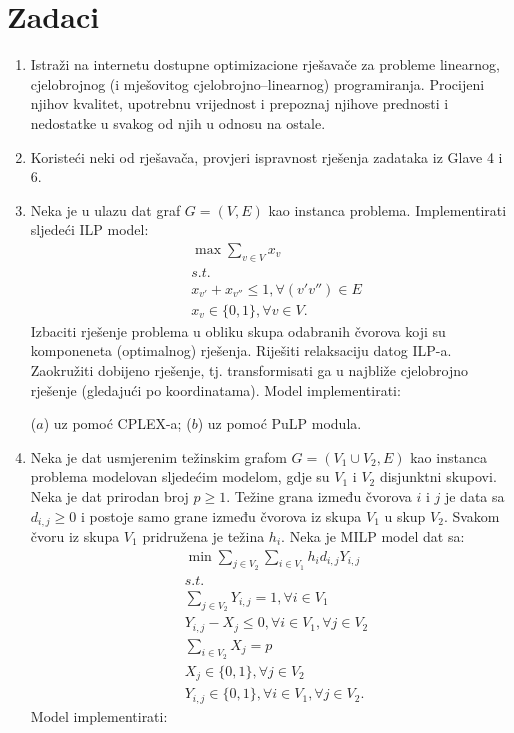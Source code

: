 \documentclass[a4paper, utf8, 11pt, colorlinks]{book}
\begin{document}
\section{Zadaci}
\begin{enumerate}
	\item Istraži na internetu dostupne optimizacione  rješavače za probleme linearnog, cjelobrojnog (i mješovitog cjelobrojno--linearnog) programiranja. Procijeni njihov kvalitet, upotrebnu vrijednost i prepoznaj njihove prednosti i nedostatke u svakog od njih u odnosu na ostale.
	
	\item Koristeći neki od rješavača, provjeri ispravnost rješenja zadataka iz Glave 4 i 6.
	
	\item Neka je u ulazu dat graf  $G = (V, E)$ kao instanca problema. Implementirati sljedeći ILP model:
	\begin{align*}
		& \max \sum_{v \in V} x_v \\
		& s.t. \\
		& x_{v'} + x_{v''} \leq 1, \forall (v' v'')\in E \\
		& x_v \in \{0, 1 \}, \forall v \in  V.
	\end{align*}
Izbaciti rješenje problema u obliku skupa odabranih čvorova koji su komponeneta (optimalnog) rješenja. Riješiti relaksaciju datog ILP-a. Zaokružiti dobijeno rješenje, tj. transformisati ga u najbliže cjelobrojno rješenje (gledajući po koordinatama).  Model implementirati:

 ($a$) uz pomoć CPLEX-a; ($b$) uz pomoć PuLP modula.
\item %
     Neka je dat usmjerenim težinskim grafom $G= (V_1 \cup V_2, E)$ kao instanca problema modelovan sljedećim modelom, gdje su $V_1$ i $V_2$ disjunktni skupovi. Neka je dat prirodan broj $p\geq 1$. Težine grana između čvorova $i$ i $j$ je data sa $d_{i,j}\geq 0 $ i postoje samo grane između čvorova iz skupa $V_1$ u skup $V_2$. Svakom čvoru iz skupa $V_1$ pridružena je težina $h_{i}$. 
     Neka je MILP model dat  sa:
     \begin{align*}
     	 &\min \sum_{j \in V_2}\sum_{i \in V_1} h_i d_{i,j} Y_{i,j} \\
     	 &s.t. \\
     	 & \sum_{j \in V_2} Y_{i, j} = 1, \forall i \in V_1 \\
     	 & Y_{i,j} - X_j \leq 0, \forall i  \in V_1, \forall j \in V_2 \\     	 
     	 & \sum_{i \in V_2} X_j  = p \\
     	 & X_j \in \{0, 1\}, \forall j \in V_2 \\
     	 & Y_{i,j} \in \{0, 1\}, \forall i \in V_1, \forall j \in V_2.
     \end{align*}
      Model implementirati:
      

\end{enumerate}
\end{document}
